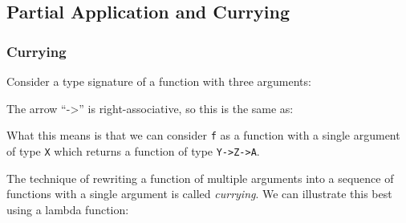 \subsection{Partial Application and
Currying}\label{partial-application-and-currying}

\subsubsection{Currying}\label{currying}

Consider a type signature of a function with three arguments:

\begin{Shaded}
\begin{Highlighting}[]
  \OtherTok{->}  \OtherTok{->}  \OtherTok{->} 
\end{Highlighting}
\end{Shaded}

The arrow ``-\textgreater{}'' is right-associative, so this is the same
as:

\begin{Shaded}
\begin{Highlighting}[]
  \OtherTok{->} \NormalTok{(} \OtherTok{->} \NormalTok{(} \OtherTok{->} \NormalTok{))}
\end{Highlighting}
\end{Shaded}

What this means is that we can consider \texttt{f} as a function with a
single argument of type \texttt{X} which returns a function of type
\texttt{Y-\textgreater{}Z-\textgreater{}A}.

The technique of rewriting a function of multiple arguments into a
sequence of functions with a single argument is called \emph{currying}.
We can illustrate this best using a lambda function:

\begin{Shaded}
\begin{Highlighting}[]
    \OtherTok{->} 
    \OtherTok{->} \OtherTok{->} \NormalTok{)}
    \OtherTok{->} \OtherTok{->} \OtherTok{->}  \NormalTok{))  }
\end{Highlighting}
\end{Shaded}

